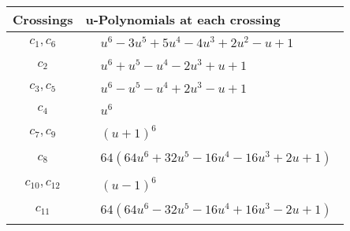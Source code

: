 \documentclass[1p]{elsarticle_modified}
\theoremstyle{definition}
\begin{document}
\begin{tabular}{m{50pt}|m{274pt}}
Crossings & \hspace{64pt}u-Polynomials at each crossing \\
\hline $$\begin{aligned}c_{1},c_{6}\end{aligned}$$&$\begin{aligned}
&u^6-3 u^5+5 u^4-4 u^3+2 u^2- u+1
\end{aligned}$\\
\hline $$\begin{aligned}c_{2}\end{aligned}$$&$\begin{aligned}
&u^6+u^5- u^4-2 u^3+u+1
\end{aligned}$\\
\hline $$\begin{aligned}c_{3},c_{5}\end{aligned}$$&$\begin{aligned}
&u^6- u^5- u^4+2 u^3- u+1
\end{aligned}$\\
\hline $$\begin{aligned}c_{4}\end{aligned}$$&$\begin{aligned}
&u^6
\end{aligned}$\\
\hline $$\begin{aligned}c_{7},c_{9}\end{aligned}$$&$\begin{aligned}
&(u+1)^6
\end{aligned}$\\
\hline $$\begin{aligned}c_{8}\end{aligned}$$&$\begin{aligned}
&64(64 u^6+32 u^5-16 u^4-16 u^3+2 u+1)
\end{aligned}$\\
\hline $$\begin{aligned}c_{10},c_{12}\end{aligned}$$&$\begin{aligned}
&(u-1)^6
\end{aligned}$\\
\hline $$\begin{aligned}c_{11}\end{aligned}$$&$\begin{aligned}
&64(64 u^6-32 u^5-16 u^4+16 u^3-2 u+1)
\end{aligned}$\\
\hline
\end{tabular}\\~\\
\end{document}
